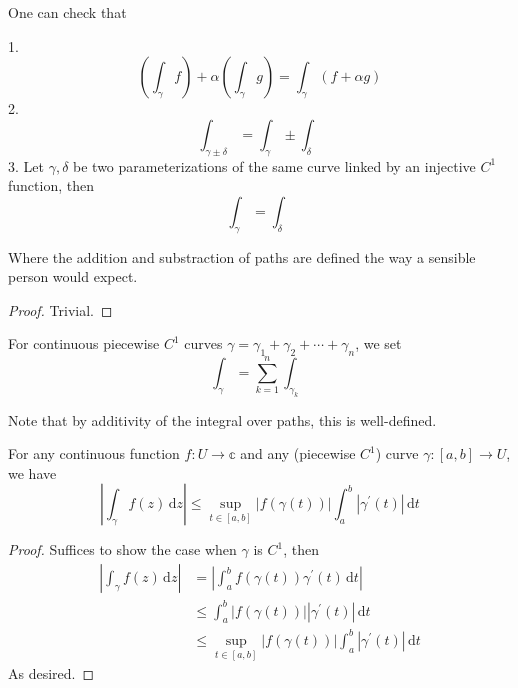 One can check that
\begin{proposition}
    1.
    $$\left(\int_{\gamma}f\right)+\alpha\left(\int_\gamma g\right)=\int_\gamma(f+\alpha g)$$
    2. 
    $$\int_{\gamma\pm\delta}=\int_\gamma\pm\int_\delta$$
    3. Let $\gamma,\delta$ be two parameterizations of the same curve linked by an injective $C^1$ function, then
    $$\int_\gamma=\int_\delta$$
\end{proposition}
Where the addition and substraction of paths are defined the way a sensible person would expect.
\begin{proof}
    Trivial.
\end{proof}
\begin{definition}
    For continuous piecewise $C^1$ curves $\gamma=\gamma_1+\gamma_2+\cdots+\gamma_n$, we set
    $$\int_\gamma=\sum_{k=1}^n\int_{\gamma_k}$$
\end{definition}
Note that by additivity of the integral over paths, this is well-defined.
\begin{proposition}
    For any continuous function $f:U\to\mathbb c$ and any (piecewise $C^1$) curve $\gamma:[a,b]\to U$, we have
    $$\left|\int_\gamma f(z)\,\mathrm dz\right|\le\sup_{t\in[a,b]}|f(\gamma(t))|\int_a^b|\gamma^\prime(t)|\,\mathrm dt$$
\end{proposition}
\begin{proof}
    Suffices to show the case when $\gamma$ is $C^1$, then
    \begin{align*}
        \left|\int_\gamma f(z)\,\mathrm dz\right|&=\left|\int_a^bf(\gamma(t))\gamma^\prime(t)\,\mathrm dt\right|\\
        &\le\int_a^b|f(\gamma(t))||\gamma^\prime(t)|\,\mathrm dt\\
        &\le\sup_{t\in[a,b]}|f(\gamma(t))|\int_a^b|\gamma^\prime(t)|\,\mathrm dt
    \end{align*}
    As desired.
\end{proof}
